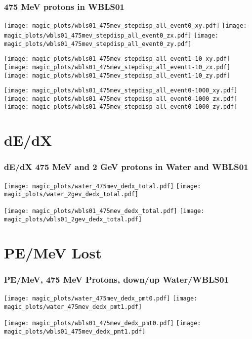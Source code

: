 \documentclass[xcolor=dvipsnames]{beamer}
\begin{document}
\begin{frame}[fragile]
  \frametitle{475 MeV protons in WBLS01}
  \texttt{[image: magic\_plots/wbls01\_475mev\_stepdisp\_all\_event0\_xy.pdf]}%
  \texttt{[image: magic\_plots/wbls01\_475mev\_stepdisp\_all\_event0\_zx.pdf]}%
  \texttt{[image: magic\_plots/wbls01\_475mev\_stepdisp\_all\_event0\_zy.pdf]}%

  \texttt{[image: magic\_plots/wbls01\_475mev\_stepdisp\_all\_event1-10\_xy.pdf]}%
  \texttt{[image: magic\_plots/wbls01\_475mev\_stepdisp\_all\_event1-10\_zx.pdf]}%
  \texttt{[image: magic\_plots/wbls01\_475mev\_stepdisp\_all\_event1-10\_zy.pdf]}%

  \texttt{[image: magic\_plots/wbls01\_475mev\_stepdisp\_all\_event0-1000\_xy.pdf]}%
  \texttt{[image: magic\_plots/wbls01\_475mev\_stepdisp\_all\_event0-1000\_zx.pdf]}%
  \texttt{[image: magic\_plots/wbls01\_475mev\_stepdisp\_all\_event0-1000\_zy.pdf]}%
\end{frame}

\section {dE/dX}

\begin{frame}[fragile]
  \frametitle{dE/dX 475 MeV and 2 GeV protons in Water and WBLS01}

  \texttt{[image: magic\_plots/water\_475mev\_dedx\_total.pdf]}%
  \texttt{[image: magic\_plots/water\_2gev\_dedx\_total.pdf]}

  \texttt{[image: magic\_plots/wbls01\_475mev\_dedx\_total.pdf]}%
  \texttt{[image: magic\_plots/wbls01\_2gev\_dedx\_total.pdf]}
\end{frame}

\section{PE/MeV Lost}

\begin{frame}[fragile]
  \frametitle{PE/MeV, 475 MeV Protons, down/up Water/WBLS01}
  \texttt{[image: magic\_plots/water\_475mev\_dedx\_pmt0.pdf]}%
  \texttt{[image: magic\_plots/water\_475mev\_dedx\_pmt1.pdf]}

  \texttt{[image: magic\_plots/wbls01\_475mev\_dedx\_pmt0.pdf]}%
  \texttt{[image: magic\_plots/wbls01\_475mev\_dedx\_pmt1.pdf]}

\end{frame}
\end{document}
